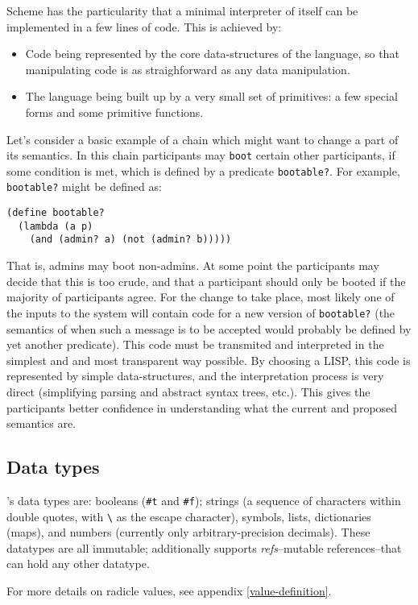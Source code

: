 Scheme has the particularity that a minimal interpreter of itself can
be implemented in a few lines of code. This is achieved by:
\begin{itemize}
  \item Code being represented by the core data-structures of the language, so
      that manipulating code is as straighforward as any data manipulation.
  \item The language being built up by a very small set of primitives: a few
    special forms and some primitive functions.
\end{itemize}
Let's consider a basic example of a chain which might want to change a part of
its semantics. In this chain participants may \texttt{boot} certain other
participants, if some condition is met, which is defined by a predicate
\texttt{bootable?}. For example, \texttt{bootable?} might be defined as:
\begin{lstlisting}
(define bootable?
  (lambda (a p)
    (and (admin? a) (not (admin? b)))))
\end{lstlisting}
That is, admins may boot non-admins. At some point the participants may decide
that this is too crude, and that a participant should only be booted if the
majority of participants agree. For the change to take place, most likely one of
the inputs to the system will contain code for a new version of
\texttt{bootable?} (the semantics of when such a message is to be accepted would
probably be defined by yet another predicate). This code must be transmited and
interpreted in the simplest and and most transparent way possible. By choosing a LISP,
this code is represented by simple data-structures, and the interpretation process is
very direct (simplifying parsing and abstract syntax trees, etc.). This
gives the participants better confidence in understanding what the current and
proposed semantics are.

\subsection{Data types}
\rad{}'s data types are: booleans (\texttt{\#t} and
\texttt{\#f}); strings (a sequence of characters within double quotes, with
\texttt{\textbackslash} as the escape character), symbols, lists, dictionaries
(maps), and numbers (currently only arbitrary-precision decimals). These
datatypes are all immutable; additionally \rad{} supports \emph{refs}--mutable
references--that can hold any other datatype.

For more details on radicle values, see appendix \ref{value-definition}.

